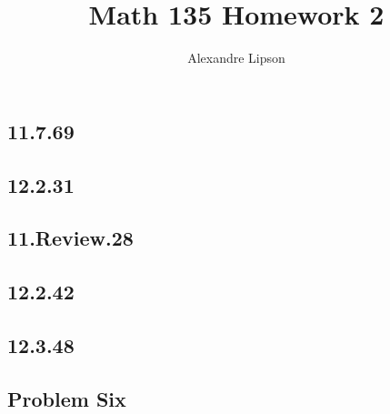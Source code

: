 \documentclass{article}
\title{Math 135 Homework 2}
\author{Alexandre Lipson}
\begin{document}
\maketitle

\subsection*{11.7.69}


\subsection*{12.2.31}


\subsection*{11.Review.28}


\subsection*{12.2.42}


\subsection*{12.3.48}


\subsection*{Problem Six}

\end{document}
